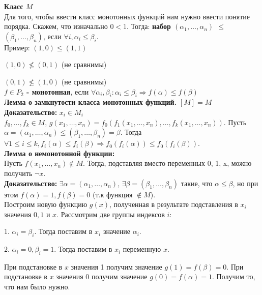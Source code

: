 \textbf{Класс $M$}\\

Для того, чтобы ввести класс монотонных функций нам нужно ввести понятие порядка. Скажем, что изначально $0 < 1$. Тогда:
\textbf{набор $(\alpha_1, \ldots, \alpha_n)$ $\le$ $(\beta_1, \ldots, \beta_n)$}, если $\forall i, \alpha_i \le \beta_i$.\\

Пример: $(1, 0) \le (1, 1)$

$(1, 0) \nleq (0, 1)$ (не сравнимы)

$(0, 1) \nleq (1, 0)$ (не сравнимы)\\

\textbf{$f \in P_2$ - монотонная}, если $\forall \alpha_i, \beta_i : \alpha_i \le \beta_i \Rightarrow f(\alpha) \le f(\beta)$\\

\textbf{Лемма о замкнутости класса монотонных функций.} $[M] = M$\\

\noindent \textbf{Доказательство:} $x_i \in M_i$\\

$f_0, \ldots, f_k \in M$, $g(x_1, \ldots, x_n) = f_0(f_1(x_1, \ldots, x_n), \ldots, f_k(x_1, \ldots, x_n))$.
Пусть $\alpha = (\alpha_1, \ldots, \alpha_n) \le (\beta_1, \ldots, \beta_n) = \beta$. Тогда $\forall 1 \le i \le k, f_i(\alpha) \le f_i(\beta) \Rightarrow f_0 ( f_i(\alpha) ) \le f_0 ( f_i (\beta) )$.\\

\textbf{Лемма о немонотонной функции:}\\

Пусть $f (x_1, \ldots, x_n) \notin M$. Тогда, подставляя вместо переменных 0, 1, x, можно получить $\neg x$.\\

\noindent \textbf{Доказательство:} $\exists \alpha = (\alpha_1, \ldots, \alpha_n)$, $\exists \beta = (\beta_1, \ldots, \beta_n)$ такие, что $\alpha \le \beta$, но при этом $f(\alpha) = 1, f(\beta) = 0$ (т.к функция $\notin M$). \\

Построим новую функцию $g(x)$, полученная в результате подставления в $x_i$ значения $0, 1$ и $x$. Рассмотрим две группы индексов $i$: 

\hspace{0.5cm}\parbox{12cm} {

1. $\alpha_i = \beta_i$. Тогда поставим в $x_i$ значение $\alpha_i$.

2. $\alpha_i = 0, \beta_i = 1$. Тогда поставим в $x_i$ переменную $x$.
}

При подстановке в $x$ значения 1 получим значение $g(1) = f(\beta) = 0$. При подстановке в $x$ значения 0 получим значение $g(0) = f(\alpha) = 1$. Получим то, что нам было нужно.
